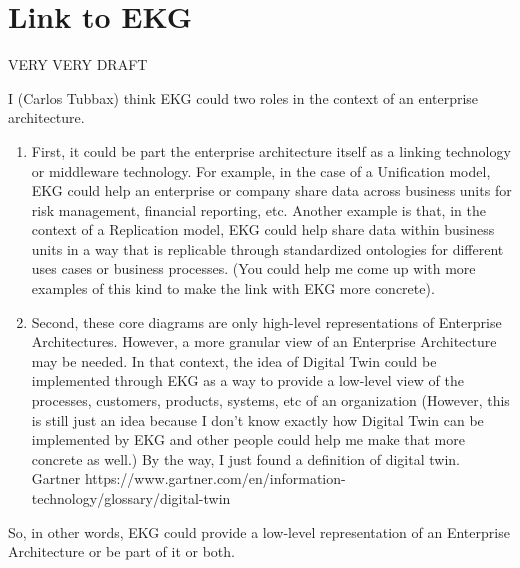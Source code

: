 \section*{Link to EKG}

VERY VERY DRAFT

I (Carlos Tubbax) think EKG could two roles in the context of an enterprise architecture.

\begin{enumerate}
    \item First, it could be part the enterprise architecture itself as a linking technology or middleware technology.
    For example, in the case of a Unification model, EKG could help an enterprise or company share data across
    business units for risk management, financial reporting, etc. Another example is that, in the context of a
    Replication model, EKG could help share data within business units in a way that is replicable through
    standardized ontologies for different uses cases or business processes.
    (You could help me come up with more examples of this kind to make the link with EKG more concrete).
    \item Second, these core diagrams are only high-level representations of Enterprise Architectures.
    However, a more granular view of an Enterprise Architecture may be needed. In that context, the idea of
    Digital Twin could be implemented through EKG as a way to provide a low-level view of the processes,
    customers, products, systems, etc of an organization
    (However, this is still just an idea because I don’t know exactly how Digital Twin can be implemented by EKG
    and other people could help me make that more concrete as well.)
    By the way, I just found a definition of digital twin.
    {Gartner}
    {https://www.gartner.com/en/information-technology/glossary/digital-twin}
\end{enumerate}

So, in other words, EKG could provide a low-level representation of an Enterprise Architecture or be part of it or both.
